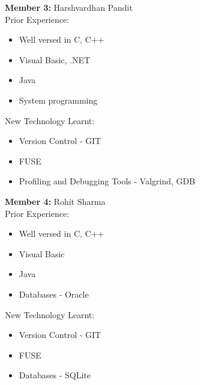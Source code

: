 \noindent \textbf{Member 3:} Harshvardhan Pandit \\
Prior Experience:
\begin{itemize}
\item Well versed in C, C++
\item Visual Basic, .NET
\item Java
\item System programming
\end{itemize}
\newpage
New Technology Learnt:
\begin{itemize}
\item Version Control - GIT
\item FUSE
\item Profiling and Debugging Tools - Valgrind, GDB
\end{itemize}

\noindent \textbf{Member 4:} Rohit Sharma \\
Prior Experience:
\begin{itemize}
\item Well versed in C, C++
\item Visual Basic
\item Java
\item Databases - Oracle
\end{itemize}
New Technology Learnt:
\begin{itemize}
\item Version Control - GIT
\item FUSE
\item Databases - SQLite
\end{itemize}